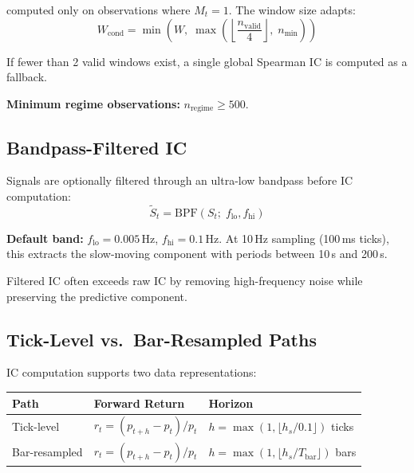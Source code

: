 \documentclass[11pt,a4paper]{article}
\newcommand{\toprule}{\hline\hline}
\newcommand{\midrule}{\hline}
\newcommand{\bottomrule}{\hline\hline}
\begin{document}
computed only on observations where $M_t = 1$. The window size adapts:
\begin{equation}
    W_{\mathrm{cond}} = \min\!\left(W,\;
        \max\!\left(\left\lfloor\frac{n_{\mathrm{valid}}}{4}\right\rfloor,
        \; n_{\min}\right)\right)
    \label{eq:adaptive_window}
\end{equation}

If fewer than 2 valid windows exist, a single global Spearman IC is
computed as a fallback.

\textbf{Minimum regime observations:} $n_{\mathrm{regime}} \geq 500$.

\subsection{Bandpass-Filtered IC}

Signals are optionally filtered through an ultra-low bandpass before IC
computation:
\begin{equation}
    \tilde{S}_t = \mathrm{BPF}(S_t;\; f_{\mathrm{lo}}, f_{\mathrm{hi}})
    \label{eq:bandpass}
\end{equation}

\textbf{Default band:} $f_{\mathrm{lo}} = 0.005$\,Hz,
$f_{\mathrm{hi}} = 0.1$\,Hz. At 10\,Hz sampling (100\,ms ticks), this
extracts the slow-moving component with periods between 10\,s and 200\,s.

Filtered IC often exceeds raw IC by removing high-frequency noise while
preserving the predictive component.

\subsection{Tick-Level vs.\ Bar-Resampled Paths}

IC computation supports two data representations:

\begin{center}
\begin{tabular}{lll}
    \toprule
    \textbf{Path} & \textbf{Forward Return} & \textbf{Horizon} \\
    \midrule
    Tick-level & $r_t = (p_{t+h} - p_t) / p_t$ &
        $h = \max(1, \lfloor h_s / 0.1 \rfloor)$ ticks \\
    Bar-resampled & $r_t = (p_{t+h} - p_t) / p_t$ &
        $h = \max(1, \lfloor h_s / T_{\mathrm{bar}} \rfloor)$ bars \\
    \bottomrule
\end{tabular}
\end{center}
\end{document}
